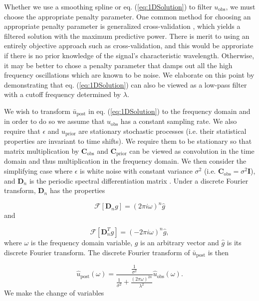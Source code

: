 \documentclass[10pt,a4paper]{article}
\begin{document}
Whether we use a smoothing spline or eq. (\ref{eq:1DSolution}) to filter $u_\mathrm{obs}$, we must choose the appropriate penalty parameter.  One common method for choosing an appropriate penalty parameter is generalized cross-validation \citep{Craven1979}, which yields a filtered solution with the maximum predictive power.  There is merit to using an entirely objective approach such as cross-validation, and this would be approriate if there is no prior knowledge of the signal's characteristic wavelength.  Otherwise, it may be better to chose a penalty parameter that damps out all the high frequency oscillations which are known to be noise.  We elaborate on this point by demonstrating that eq. (\ref{eq:1DSolution}) can also be viewed as a low-pass filter with a cutoff frequency determined by $\lambda$.  

We wish to transform $\bar{u}_\mathrm{post}$ in eq. (\ref{eq:1DSolution}) to the frequency domain and in order to do so we assume that $u_\mathrm{obs}$ has a constant sampling rate. We also require that $\epsilon$ and $u_\mathrm{prior}$ are stationary stochastic processes (i.e. their statistical properties are invariant to time shifts).  We require them to be stationary so that matrix multiplication by $\mathbf{C}_\mathrm{obs}$ and $\mathbf{C}_\mathrm{prior}$ can be viewed as convolution in the time domain and thus multiplication in the frequency domain.  We then consider the simplifying case where $\epsilon$ is white noise with constant variance $\sigma^2$ (i.e. $\mathbf{C}_\mathrm{obs} = \sigma^2\mathbf{I}$), and $\mathbf{D}_n$ is the periodic spectral differentiation matrix \citep[e.g.][]{Trefethen2000}.  Under a discrete Fourier transform, $\mathbf{D}_n$ has the properties

\begin{equation}\label{eq:Property1}
  \mathcal{F}[\mathbf{D}_ng] = (2\pi i\omega)^n \hat{g}
\end{equation}
and

\begin{equation}\label{eq:Property2}
  \mathcal{F}[\mathbf{D}^T_ng] = (-2\pi i\omega)^n \hat{g},
\end{equation}
where $\omega$ is the frequency domain variable, $g$ is an arbitrary vector and $\hat{g}$ is its discrete Fourier transform.  The discrete Fourier transform of $\bar{u}_\mathrm{post}$ is then

\begin{equation}\label{eq:1DFourierSoln1}
\hat{u}_\mathrm{post}(\omega) = \frac{\frac{1}{\sigma^2}}
                                  {\frac{1}{\sigma^2} +                  
                                  \frac{(2\pi\omega)^{2n}}{\lambda^2}}
                                  \hat{u}_\mathrm{obs}(\omega).
\end{equation}
We make the change of variables 
\end{document}
